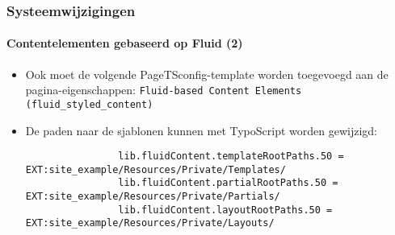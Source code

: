 \begin{frame}[fragile]
	\frametitle{Systeemwijzigingen}
	\framesubtitle{Contentelementen gebaseerd op Fluid (2)}

	\lstset{basicstyle=\tiny\ttfamily}

	\begin{itemize}

		\item Ook moet de volgende PageTSconfig-template worden toegevoegd aan de pagina-eigenschappen:\newline
			\small
				\texttt{Fluid-based Content Elements (fluid\_styled\_content)}
			\normalsize

		\item De paden naar de sjablonen kunnen met TypoScript worden gewijzigd:

			\begin{lstlisting}
				lib.fluidContent.templateRootPaths.50 = EXT:site_example/Resources/Private/Templates/
				lib.fluidContent.partialRootPaths.50 = EXT:site_example/Resources/Private/Partials/
				lib.fluidContent.layoutRootPaths.50 = EXT:site_example/Resources/Private/Layouts/
			\end{lstlisting}

	\end{itemize}

\end{frame}



